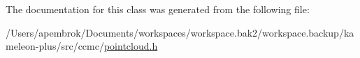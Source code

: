 The documentation for this class was generated from the following file\-:\begin{DoxyCompactItemize}
\item 
/\-Users/apembrok/\-Documents/workspaces/workspace.\-bak2/workspace.\-backup/kameleon-\/plus/src/ccmc/\hyperlink{pointcloud_8h}{pointcloud.\-h}\end{DoxyCompactItemize}
